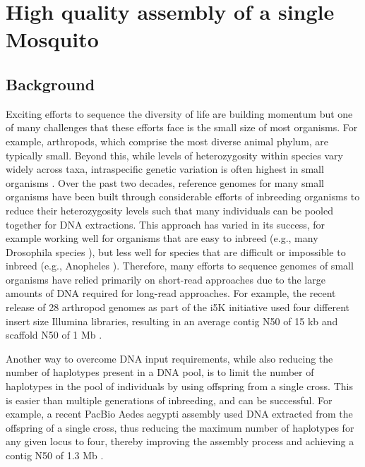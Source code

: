 \chapter{High quality assembly of a single Mosquito}

\ifpdf
    \graphicspath{{Chapter3/Figs/Raster/}{Chapter3/Figs/PDF/}{Chapter3/Figs/}}
\else
    \graphicspath{{Chapter3/Figs/Vector/}{Chapter3/Figs/}}
\fi



\section{Background}

Exciting efforts to sequence the diversity of life are building momentum \cite{Lewin2018-lc} but one of many challenges that these efforts face is the small size of most organisms. For example, arthropods, which comprise the most diverse animal phylum, are typically small. Beyond this, while levels of heterozygosity within species vary widely across taxa, intraspecific genetic variation is often highest in small organisms \cite{Leffler2012-uh}. Over the past two decades, reference genomes for many small organisms have been built through considerable efforts of inbreeding organisms to reduce their heterozygosity levels such that many individuals can be pooled together for DNA extractions. This approach has varied in its success, for example working well for organisms that are easy to inbreed (e.g., many Drosophila species \cite{Drosophila_12_Genomes_Consortium2007-fx}), but less well for species that are difficult or impossible to inbreed (e.g., Anopheles \cite{Neafsey2015-op}). Therefore, many efforts to sequence genomes of small organisms have relied primarily on short-read approaches due to the large amounts of DNA required for long-read approaches. For example, the recent release of 28 arthropod genomes as part of the i5K initiative used four different insert size Illumina libraries, resulting in an average contig N50 of 15 kb and scaffold N50 of 1 Mb \cite{Thomas2018-rk}.


Another way to overcome DNA input requirements, while also reducing the number of haplotypes present in a DNA pool, is to limit the number of haplotypes in the pool of individuals by using offspring from a single cross. This is easier than multiple generations of inbreeding, and can be successful. For example, a recent PacBio Aedes aegypti assembly used DNA extracted from the offspring of a single cross, thus reducing the maximum number of haplotypes for any given locus to four, thereby improving the assembly process and achieving a contig N50 of 1.3 Mb \cite{Matthews2018-th}.

